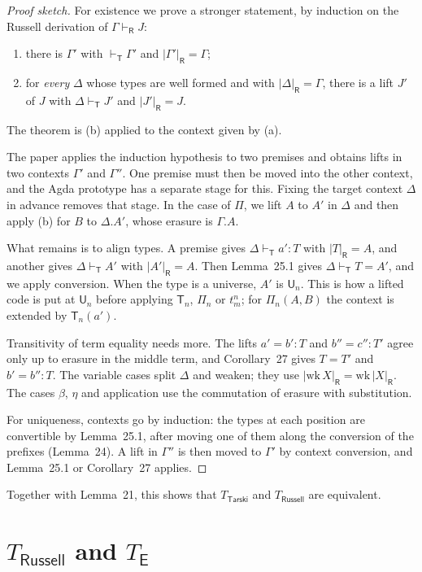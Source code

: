 \documentclass[11pt]{article}
\theoremstyle{definition}
\theoremstyle{remark}
\newcommand{\vdashT}{\vdash_{\mathsf T}}
\newcommand{\U}{\mathsf U}
\newcommand{\T}{\mathsf T}
\newcommand{\vdashR}{\vdash_{\mathsf R}}
\newcommand{\erR}[1]{|#1|_{\mathsf R}}
\begin{document}
\begin{proof}[Proof sketch]
For existence we prove a stronger statement, by induction on the Russell
derivation of $\Gamma\vdashR J$:
\begin{enumerate}
\item[(a)] there is $\Gamma'$ with $\vdashT\Gamma'$ and $\erR{\Gamma'}=\Gamma$;
\item[(b)] for \emph{every} $\Delta$ whose types are well formed and with
$\erR\Delta=\Gamma$, there is a lift $J'$ of $J$ with $\Delta\vdashT J'$
and $\erR{J'}=J$.
\end{enumerate}
The theorem is (b) applied to the context given by (a).

The paper applies the induction hypothesis to two premises and obtains
lifts in two contexts $\Gamma'$ and $\Gamma''$. One premise must then be
moved into the other context, and the Agda prototype has a separate stage
for this. Fixing the target context $\Delta$ in advance removes that stage.
In the case of $\Pi$, we lift $A$ to $A'$ in $\Delta$ and then apply (b)
for $B$ to $\Delta.A'$, whose erasure is $\Gamma.A$.

What remains is to align types. A premise gives $\Delta\vdashT a':T$ with
$\erR T=A$, and another gives $\Delta\vdashT A'$ with $\erR{A'}=A$. Then
Lemma~25.1 gives $\Delta\vdashT T=A'$, and we apply conversion. When the
type is a universe, $A'$ is $\U_n$. This is how a lifted code is put at
$\U_n$ before applying $\T_n$, $\Pi_n$ or $t^n_m$; for
$\Pi_n(A,B)$ the context is extended by $\T_n(a')$.

Transitivity of term equality needs more. The lifts $a'=b':T$ and
$b''=c'':T'$ agree only up to erasure in the middle term, and
Corollary~27 gives $T=T'$ and $b'=b'':T$. The variable cases split $\Delta$
and weaken; they use $\erR{\mathrm{wk}\,X}=\mathrm{wk}\,\erR X$. The cases
$\beta$, $\eta$ and application use the commutation of erasure with
substitution.

For uniqueness, contexts go by induction: the types at each position are
convertible by Lemma~25.1, after moving one of them along the conversion
of the prefixes (Lemma~24). A lift in $\Gamma''$ is then moved to
$\Gamma'$ by context conversion, and Lemma~25.1 or Corollary~27 applies.
\end{proof}

Together with Lemma~21, this shows that $T_{\mathsf{Tarski}}$ and
$T_{\mathsf{Russell}}$ are equivalent.

\section{$T_{\mathsf{Russell}}$ and $T_{\mathsf E}$}\label{sec:compose}
\end{document}
